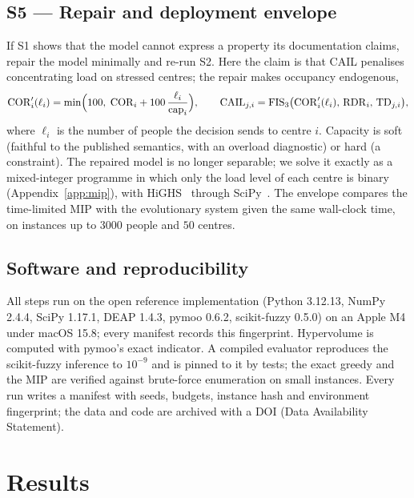 \documentclass[systems,article,submit,moreauthors,pdftex]{Definitions/mdpi}
\begin{document}
\subsection{S5 --- Repair and deployment envelope}
If S1 shows that the model cannot express a property its documentation claims, repair the
model minimally and re-run S2. Here the claim is that CAIL penalises concentrating load on
stressed centres; the repair makes occupancy endogenous,
\begin{equation}
\mathrm{COR}'_i(\ell_i) = \min\Bigl(100,\; \mathrm{COR}_i + 100\,\frac{\ell_i}{\mathrm{cap}_i}\Bigr),
\qquad
\mathrm{CAIL}_{j,i} = \mathrm{FIS}_3\bigl(\mathrm{COR}'_i(\ell_i),\, \mathrm{RDR}_i,\, \mathrm{TD}_{j,i}\bigr),
\end{equation}
where $\ell_i$ is the number of people the decision sends to centre $i$. Capacity is soft
(faithful to the published semantics, with an overload diagnostic) or hard (a constraint).
The repaired model is no longer separable; we solve it exactly as a mixed-integer programme
in which only the load level of each centre is binary (Appendix~\ref{app:mip}), with HiGHS~\cite{huangfu2018highs}
through SciPy~\cite{virtanen2020scipy}. The envelope compares the time-limited MIP with the
evolutionary system given the same wall-clock time, on instances up to $3000$ people and
$50$ centres.

\subsection{Software and reproducibility}
All steps run on the open reference implementation (Python 3.12.13, NumPy 2.4.4, SciPy
1.17.1, DEAP 1.4.3, pymoo 0.6.2, scikit-fuzzy 0.5.0) on an Apple M4 under macOS 15.8; every
manifest records this fingerprint. Hypervolume is computed with pymoo's exact indicator. A
compiled evaluator reproduces the
scikit-fuzzy inference to $10^{-9}$ and is pinned to it by tests; the exact greedy and the
MIP are verified against brute-force enumeration on small instances. Every run writes a
manifest with seeds, budgets, instance hash and environment fingerprint; the data and code
are archived with a DOI (Data Availability Statement).

\section{Results}\label{sec:results}
\end{document}
